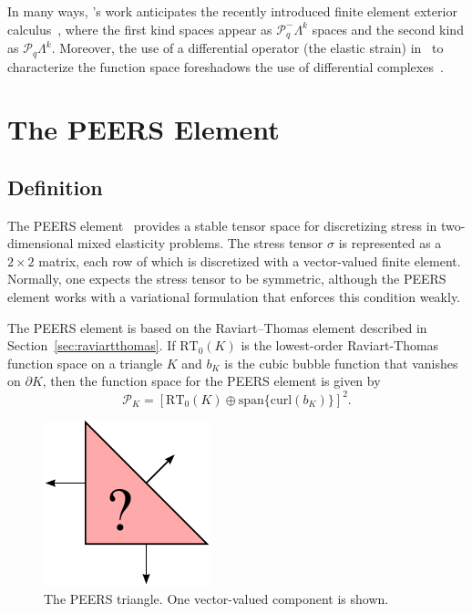 In many ways, \nedelec{}'s work anticipates the recently introduced
finite element exterior calculus~\cite{ArnoldFalkWinther2006d}, where the
first kind spaces appear as \( \mathcal{P}_q^-\Lambda^k \) spaces and
the second kind as \(
\mathcal{P}_q\Lambda^k \). Moreover, the use of a differential
operator (the elastic strain) in~\cite{Nedelec1980} to characterize
the function space foreshadows the use of differential
complexes~\cite{ArnoldFalkWinther2006da}.


\newpage

\section{The PEERS Element}

\subsection{Definition}

The PEERS element~\cite{ArnoldBrezzi1974aDouglas1984} provides a stable tensor
space for discretizing stress in two-dimensional mixed elasticity
problems. The stress tensor \( \sigma \) is represented as a \( 2
\times 2 \) matrix, each row of which is discretized with a
vector-valued finite element.  Normally, one expects the stress tensor
to be symmetric, although the PEERS element works with a variational
formulation that enforces this condition weakly.

The PEERS element is based on the Raviart--Thomas element described in
Section~\ref{sec:raviartthomas}.  If \( \mathrm{RT}_0(K) \) is the
lowest-order Raviart-Thomas function space on a triangle \( K \) and
\( b_K \) is the cubic bubble function that vanishes on \( \partial K
\), then the function space for the PEERS element is given by
\begin{displaymath}
\mathcal{P}_K = \left[\mathrm{RT}_0(K) \oplus \mathrm{span}\{\mathrm{curl}( b_K )\} \right]^2.
\end{displaymath}

\begin{figure}[h]
  \begin{center}
    \includegraphics[width=\smallfig]{chapters/kirby-6/pdf/PEERS.pdf}
    \caption{The PEERS triangle. One vector-valued component is shown.}
  \end{center}
\end{figure}


